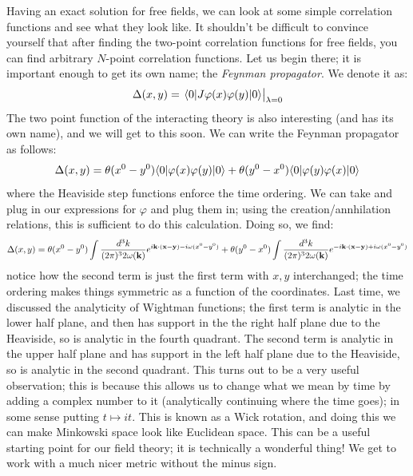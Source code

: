 Having an exact solution for free fields, we can look at some simple correlation functions and see what they look like. It shouldn't be difficult to convince yourself that after finding the two-point correlation functions for free fields, you can find arbitrary $N$-point correlation functions. Let us begin there; it is important enough to get its own name; the \emph{Feynman propagator}. We denote it as:
\begin{equation}
    \Delta(x, y) = \left.\bra{0}J\varphi(x)\varphi(y)\ket{0} \right|_{\lambda=0}
\end{equation}
The two point function of the interacting theory is also interesting (and has its own name), and we will get to this soon. We can write the Feynman propagator as follows:
\begin{equation}
    \Delta(x, y) = \theta(x^0 - y^0)\bra{0}\varphi(x)\varphi(y)\ket{0} + \theta(y^0 - x^0)\bra{0}\varphi(y)\varphi(x)\ket{0}
\end{equation}
where the Heaviside step functions enforce the time ordering. We can take and plug in our expressions for $\varphi$ and plug them in; using the creation/annhilation relations, this is sufficient to do this calculation. Doing so, we find:
\begin{equation}
    \Delta(x, y) = \theta(x^0 - y^0) \int \frac{d^3k}{(2\pi)^3 2\omega(\mathbf{k})}e^{i\mathbf{k} \cdot (\mathbf{x} - \mathbf{y}) - i\omega(x^0 - y^0)} + \theta(y^0 - x^0)\int \frac{d^3k}{(2\pi)^3 2\omega(\mathbf{k})}e^{-i\mathbf{k} \cdot (\mathbf{x} - \mathbf{y}) + i\omega(x^0 - y^0)}
\end{equation}
notice how the second term is just the first term with $x, y$ interchanged; the time ordering makes things symmetric as a function of the coordinates. Last time, we discussed the analyticity of Wightman functions; the first term is analytic in the lower half plane, and then has support in the the right half plane due to the Heaviside, so is analytic in the fourth quadrant. The second term is analytic in the upper half plane and has support in the left half plane due to the Heaviside, so is analytic in the second quadrant. This turns out to be a very useful observation; this is because this allows us to change what we mean by time by adding a complex number to it (analytically continuing where the time goes); in some sense putting $t \mapsto it$. This is known as a Wick rotation, and doing this we can make Minkowski space look like Euclidean space. This can be a useful starting point for our field theory; it is technically a wonderful thing! We get to work with a much nicer metric without the minus sign.

